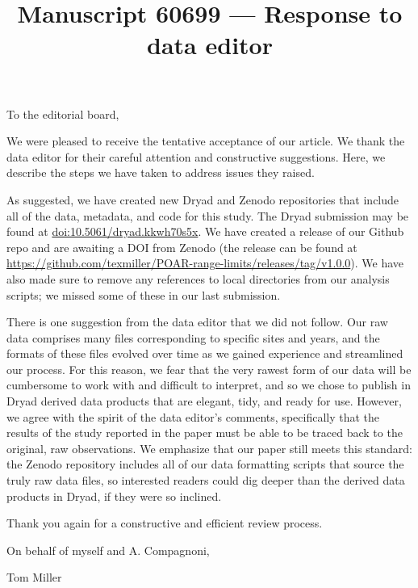\documentclass[12pt]{article}
\begin{document}
\title{Manuscript 60699 --- Response to data editor}

\maketitle
\noindent To the editorial board,

We were pleased to receive the tentative acceptance of our article. We thank the data editor for their careful attention and constructive suggestions. Here, we describe the steps we have taken to address issues they raised. 

As suggested, we have created new Dryad and Zenodo repositories that include all of the data, metadata, and code for this study. The Dryad submission may be found at \url{doi:10.5061/dryad.kkwh70s5x}. We have created a release of our Github repo and are awaiting a DOI from Zenodo (the release can be found at \url{https://github.com/texmiller/POAR-range-limits/releases/tag/v1.0.0}). We have also made sure to remove any references to local directories from our analysis scripts; we missed some of these in our last submission. 

There is one suggestion from the data editor that we did not follow. Our raw data comprises many files corresponding to specific sites and years, and the formats of these files evolved over time as we gained experience and streamlined our process. For this reason, we fear that the very rawest form of our data will be cumbersome to work with and difficult to interpret, and so we chose to publish in Dryad derived data products that are elegant, tidy, and ready for use. However, we agree with the spirit of the data editor's comments, specifically that the results of the study reported in the paper must be able to be traced back to the original, raw observations. We emphasize that our paper still meets this standard: the Zenodo repository includes all of our data formatting scripts that source the truly raw data files, so interested readers could dig deeper than the derived data products in Dryad, if they were so inclined. 

Thank you again for a constructive and efficient review process. 

\vspace{2em}
\hfill On behalf of myself and A. Compagnoni,

\hfill Tom Miller
\newpage

\end{document}
